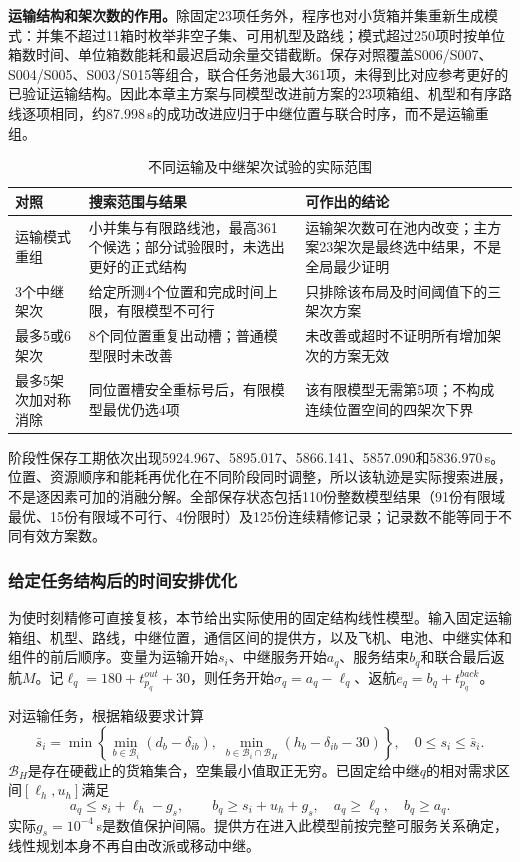 \textbf{运输结构和架次数的作用。}除固定23项任务外，程序也对小货箱并集重新生成模式：并集不超过11箱时枚举非空子集、可用机型及路线；模式超过250项时按单位箱数时间、单位箱数能耗和最迟启动余量交错截断。保存对照覆盖S006/S007、S004/S005、S003/S015等组合，联合任务池最大361项，未得到比对应参考更好的已验证运输结构。因此本章主方案与同模型改进前方案的23项箱组、机型和有序路线逐项相同，约87.998\,s的成功改进应归于中继位置与联合时序，而不是运输重组。

\begin{table}[htbp]\centering\small
\caption{不同运输及中继架次试验的实际范围}\label{tab:q3_sortie_scope}
\begin{tabularx}{\linewidth}{p{3.0cm}XX}\toprule
对照 & 搜索范围与结果 & 可作出的结论\\\midrule
运输模式重组 & 小并集与有限路线池，最高361个候选；部分试验限时，未选出更好的正式结构 & 运输架次数可在池内改变；主方案23架次是最终选中结果，不是全局最少证明\\
3个中继架次 & 给定所测4个位置和完成时间上限，有限模型不可行 & 只排除该布局及时间阈值下的三架次方案\\
最多5或6架次 & 8个同位置重复出动槽；普通模型限时未改善 & 未改善或超时不证明所有增加架次的方案无效\\
最多5架次加对称消除 & 同位置槽安全重标号后，有限模型最优仍选4项 & 该有限模型无需第5项；不构成连续位置空间的四架次下界\\\bottomrule
\end{tabularx}
\end{table}

阶段性保存工期依次出现5924.967、5895.017、5866.141、5857.090和5836.970\,s。位置、资源顺序和能耗再优化在不同阶段同时调整，所以该轨迹是实际搜索进展，不是逐因素可加的消融分解。全部保存状态包括110份整数模型结果（91份有限域最优、15份有限域不可行、4份限时）及125份连续精修记录；记录数不能等同于不同有效方案数。

\subsubsection{给定任务结构后的时间安排优化}
\label{sec:q3_fixed_lp}
为使时刻精修可直接复核，本节给出实际使用的固定结构线性模型。输入固定运输箱组、机型、路线，中继位置，通信区间的提供方，以及飞机、电池、中继实体和组件的前后顺序。变量为运输开始$s_i$、中继服务开始$a_q$、服务结束$b_q$和联合最后返航$M$。记$\ell_q=180+t_{p_q}^{out}+30$，则任务开始$\sigma_q=a_q-\ell_q$、返航$e_q=b_q+t_{p_q}^{back}$。

对运输任务，根据箱级要求计算
\begin{equation}
 \bar s_i=\min\left\{\min_{b\in\mathcal B_i}(d_b-\delta_{ib}),\;
 \min_{b\in\mathcal B_i\cap\mathcal B_H}(h_b-\delta_{ib}-30)\right\},
 \quad 0\le s_i\le\bar s_i .
 \label{eq:q3_lp_start_bounds}
\end{equation}
$\mathcal B_H$是存在硬截止的货箱集合，空集最小值取正无穷。已固定给中继$q$的相对需求区间$[\ell_h,u_h]$满足
\begin{equation}
 a_q\le s_i+\ell_h-g_s,\qquad b_q\ge s_i+u_h+g_s,
 \quad a_q\ge\ell_q,\quad b_q\ge a_q .
 \label{eq:q3_lp_coverage}
\end{equation}
实际$g_s=10^{-4}$\,s是数值保护间隔。提供方在进入此模型前按完整可服务关系确定，线性规划本身不再自由改派或移动中继。

